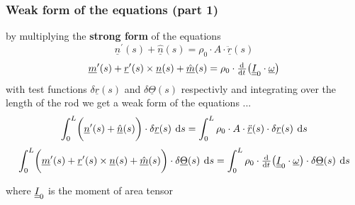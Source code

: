\begin{frame}
  \frametitle{Weak form of the equations (part 1)}

  by multiplying the \textbf{strong form} of the equations
  \begin{displaymath}
    \underline{n}^{\prime}(s) + \underline{\hat{n}}(s) =
    \rho_0 \cdot A \cdot \underline{\ddot{r}}(s)
  \end{displaymath}
  \begin{displaymath}
    \underline{m}^{\prime}(s) + \underline{r}^{\prime}(s) \times \underline{n}(s) + \underline{\hat{m}}(s) =
    \rho_0 \cdot
    \od{}{t} \bigl( \doubleunderline{I}_0 \cdot \underline{\omega} \bigr)
  \end{displaymath}
  with test functions $\delta \underline{r}(s)$ and $\delta \underline{\Theta}(s)$ respectivly and integrating over the length of the rod we get a weak form of the equations ...
  \begin{displaymath}
    \int_0^L \biggl( \underline{n}^{\prime}(s) + \underline{\hat{n}}(s) \biggr) \cdot \delta \underline{r}(s) \: \dif s  =
    \int_0^L \rho_0 \cdot A \cdot \underline{\ddot{r}}(s) \cdot \delta \underline{r}(s) \: \dif s
  \end{displaymath}
  \begin{displaymath}
    \int_0^L \biggl( \underline{m}^{\prime}(s) + \underline{r}^{\prime}(s) \times \underline{n}(s) + \underline{\hat{m}}(s) \biggr) \cdot \delta \underline{\Theta}(s) \: \dif s =
    \int_0^L \rho_0 \cdot
    \od{}{t} \bigl( \doubleunderline{I}_0 \cdot \underline{\omega} \bigr) \cdot \delta \underline{\Theta}(s) \: \dif s
  \end{displaymath}
  
  where $\underline{\underline{I}}_0$ is the moment of area tensor
 
\end{frame}


